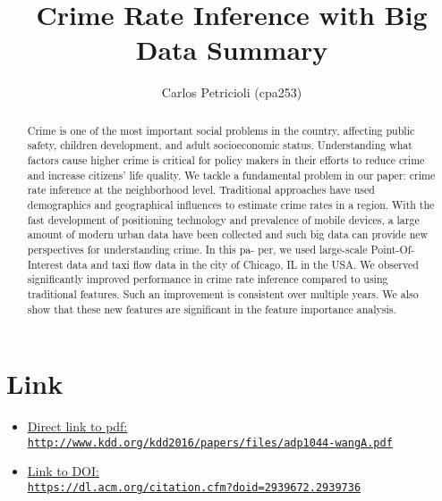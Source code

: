 \documentclass[11pt]{article}
\title{Crime Rate Inference with Big Data Summary}
\author{Carlos Petricioli (cpa253)}
\begin{document}
\maketitle

\begin{abstract}
Crime is one of the most important social problems in the country, affecting public safety, children development, and adult socioeconomic status. Understanding what factors cause higher crime is critical for policy makers in their efforts to reduce crime and increase citizens’ life quality. We tackle a fundamental problem in our paper: crime rate inference at the neighborhood level. Traditional approaches have used demographics and geographical influences to estimate crime rates in a region. With the fast development of positioning technology and prevalence of mobile devices, a large amount of modern urban data have been collected and such big data can provide new perspectives for understanding crime. In this pa- per, we used large-scale Point-Of-Interest data and taxi flow data in the city of Chicago, IL in the USA. We observed significantly improved performance in crime rate inference compared to using traditional features. Such an improvement is consistent over multiple years. We also show that these new features are significant in the feature importance analysis.

\end{abstract}

\section*{Link}

\begin{itemize}
\item \href{http://www.kdd.org/kdd2016/papers/files/adp1044-wangA.pdf}{Direct link to pdf:\\ \texttt{http://www.kdd.org/kdd2016/papers/files/adp1044-wangA.pdf}}

\item \href{https://dl.acm.org/citation.cfm?doid=2939672.2939736}{Link to DOI:\\ \texttt{https://dl.acm.org/citation.cfm?doid=2939672.2939736}}
\end{itemize}
\end{document}
